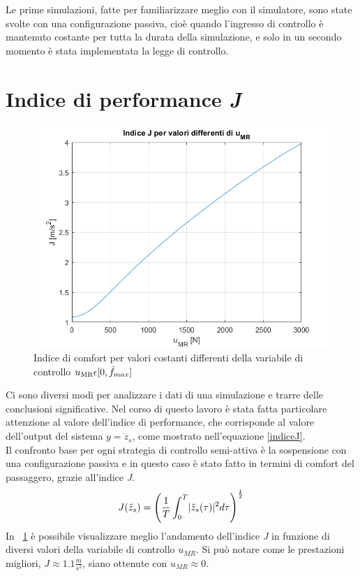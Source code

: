 Le prime simulazioni, fatte per familiarizzare meglio con il simulatore, sono state svolte con una configurazione passiva, cioè quando l'ingresso di controllo è mantenuto costante per tutta la durata della simulazione, e solo in un secondo momento è stata implementata la legge di controllo.

\section{Indice di performance \textit{J}}
\begin{figure}[htb]
	\centering
	\includegraphics[scale=0.5]{figure/indice_performance.png}
	\caption{Indice di comfort per valori costanti differenti della variabile di controllo $u\textsubscript{MR} \epsilon [0,\tilde{f}_{max}]$}
	\label{fig:indiceperformance}
\end{figure}
Ci sono diversi modi per analizzare i dati di una simulazione e trarre delle conclusioni significative. Nel corso di questo lavoro è stata fatta particolare attenzione al valore dell'indice di performance, che corrisponde al valore dell'output del sistema $y = \ddot{z}_s$, come mostrato nell'equazione \eqref{indiceJ}.\\
Il confronto base per ogni strategia di controllo semi-attiva è la sospensione con una configurazione passiva e in questo caso è stato fatto in termini di comfort del passaggero, grazie all'indice \textit{J}.
\begin{equation}
	\centering
	J(\ddot{z}_s) = \left(\frac{1}{T}\int_{0}^{T}\lvert \ddot{z}_s(\tau) \rvert ^2 d\tau\right)^\frac{1}{2}
	\label{indiceJ}
\end{equation}
In \figurename \ \ref{fig:indiceperformance} è possibile visualizzare meglio l'andamento dell'indice \textit{J} in funzione di diversi valori della variabile di controllo $u_{MR}$. Si può notare come le prestazioni migliori, ${J\approx1.1\frac{m}{s^2}}$, siano ottenute con $u_{MR}\approx0$.


